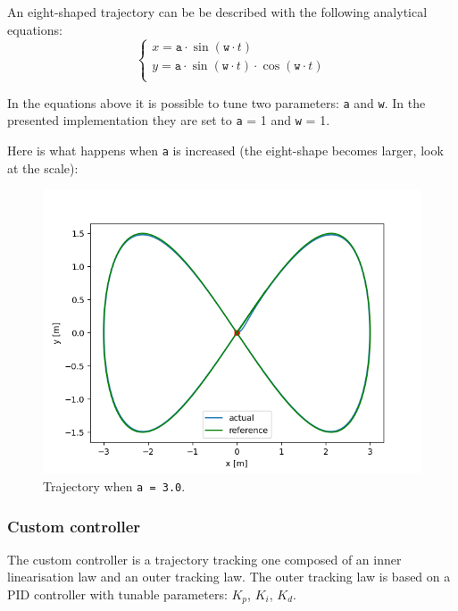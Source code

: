 \documentclass[11pt,a4paper]{article}
\begin{document}
An eight-shaped trajectory can be be described with the following analytical equations:
$$
\begin{cases}
    x = \texttt{a} \cdot \sin (\texttt{w} \cdot t)\\
    y = \texttt{a} \cdot \sin (\texttt{w} \cdot t)\cdot \cos (\texttt{w} \cdot t)\\
\end{cases}
$$

In the equations above it is possible to tune two parameters: \texttt{a} and \texttt{w}.
In the presented implementation they are set to \texttt{a} = 1 and \texttt{w} = 1.\\

\newpage

Here is what happens when \texttt{a} is increased (the eight-shape becomes larger, look at the scale):

\begin{figure}[H]
    \centering
    \includegraphics[scale=0.5]{different_params/custom_a3/Trajectory.png}
    \caption{Trajectory when \texttt{a = 3.0}.}
\end{figure}

\subsubsection{Custom controller}

The custom controller is a trajectory tracking one composed of an inner linearisation law and
an outer tracking law.
The outer tracking law is based on a PID controller with tunable parameters: $K_p$, $K_i$, $K_d$.\\
\end{document}
